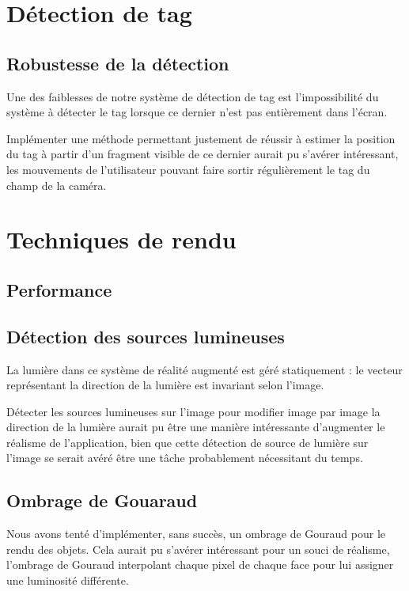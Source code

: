 \newpage
{}

\section{Détection de tag}

    \subsection{Robustesse de la détection}

    Une des faiblesses de notre système de détection de tag est l'impossibilité du système à détecter le tag lorsque ce dernier n'est pas entièrement dans l'écran.

    Implémenter une méthode permettant justement de réussir à estimer la position du tag à partir d'un fragment visible de ce dernier aurait pu s'avérer intéressant, les mouvements de l'utilisateur pouvant faire sortir régulièrement le tag du champ de la caméra.

\section{Techniques de rendu}

    \subsection{Performance}

    \subsection{Détection des sources lumineuses}

    La lumière dans ce système de réalité augmenté est géré statiquement : le vecteur représentant la direction de la lumière est invariant selon l'image.

    Détecter les sources lumineuses sur l'image pour modifier image par image la direction de la lumière aurait pu être une manière intéressante d'augmenter le réalisme de l'application, bien que cette détection de source de lumière sur l'image se serait avéré être une tâche probablement nécessitant du temps.

    \subsection{Ombrage de Gouaraud}

    Nous avons tenté d'implémenter, sans succès, un ombrage de Gouraud pour le rendu des objets. Cela aurait pu s'avérer intéressant pour un souci de réalisme, l'ombrage de Gouraud interpolant chaque pixel de chaque face pour lui assigner une luminosité différente.

